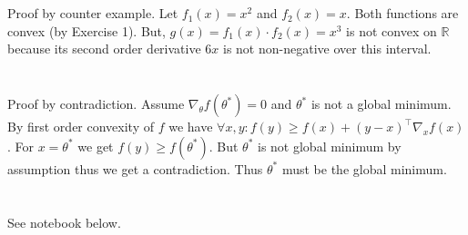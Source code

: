 \documentclass[11pt]{article}
\newcommand{\exercise}{\section{}}
\newcommand{\tf}[1]{{#1}^{\intercal}}
\newcommand{\gradf}[2]{\nabla_{#1}{#2}}
\begin{document}
\exercise

Proof by counter example. Let $f_1(x) = x^2$ and $f_2(x) = x$. Both functions are convex (by Exercise 1). But, $g(x) = f_1(x) \cdot f_2(x) = x^3$ is not convex on $\mathbb{R}$ because its second order derivative $6x$ is not non-negative over this interval.
\exercise

Proof by contradiction. Assume $\gradf{\theta}{f(\theta^*)} = 0$ and $\theta^*$ is not a global minimum. By first order convexity of $f$ we have $ \forall x, y : f(y) \ge f(x) + \tf{(y - x)} \gradf{x}{f(x)}$. For $x = \theta^*$ we get
$f(y) \ge f(\theta^*)$. But $\theta^*$ is not global minimum by assumption thus we get a contradiction. Thus $\theta^*$ must be the global minimum.
\exercise
See notebook below.
\end{document}
